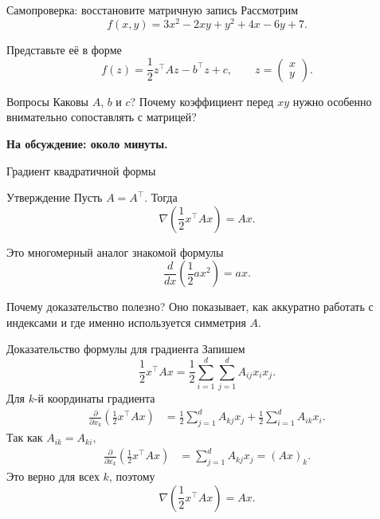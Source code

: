 \documentclass[aspectratio=169,10pt]{beamer}
\newcommand{\grad}{\nabla}
\begin{document}
\begin{frame}{Самопроверка: восстановите матричную запись}
\small
Рассмотрим
\[
 f(x,y)=3x^2-2xy+y^2+4x-6y+7.
\]

Представьте её в форме
\[
 f(z)=\frac12z^\top Az-b^\top z+c,
 \qquad
 z=\begin{pmatrix}x\\y\end{pmatrix}.
\]

\vspace{0.5em}
\begin{block}{Вопросы}
Каковы $A$, $b$ и $c$? Почему коэффициент перед $xy$ нужно особенно внимательно сопоставлять с матрицей?
\end{block}

\vfill
\centering
\textbf{На обсуждение: около минуты.}
\end{frame}

\begin{frame}{Градиент квадратичной формы}
\small
\begin{block}{Утверждение}
Пусть $A=A^\top$. Тогда
\[
 \boxed{
 \grad\left(\frac12x^\top Ax\right)=Ax.
 }
\]
\end{block}

Это многомерный аналог знакомой формулы
\[
 \frac{d}{dx}\left(\frac12ax^2\right)=ax.
\]

\begin{alertblock}{Почему доказательство полезно?}
Оно показывает, как аккуратно работать с индексами и где именно используется симметрия $A$.
\end{alertblock}
\end{frame}

\begin{frame}{Доказательство формулы для градиента}
\footnotesize
Запишем
\[
 \frac12x^\top Ax=\frac12\sum_{i=1}^{d}\sum_{j=1}^{d}A_{ij}x_ix_j.
\]
Для $k$-й координаты градиента
\[
\begin{aligned}
\frac{\partial}{\partial x_k}\left(\frac12x^\top Ax\right)
&=\frac12\sum_{j=1}^{d}A_{kj}x_j
 +\frac12\sum_{i=1}^{d}A_{ik}x_i.
\end{aligned}
\]
Так как $A_{ik}=A_{ki}$,
\[
\begin{aligned}
\frac{\partial}{\partial x_k}\left(\frac12x^\top Ax\right)
&=\sum_{j=1}^{d}A_{kj}x_j
=(Ax)_k.
\end{aligned}
\]
Это верно для всех $k$, поэтому
\[
 \boxed{\grad\left(\frac12x^\top Ax\right)=Ax.}
\]
\end{frame}
\end{document}

